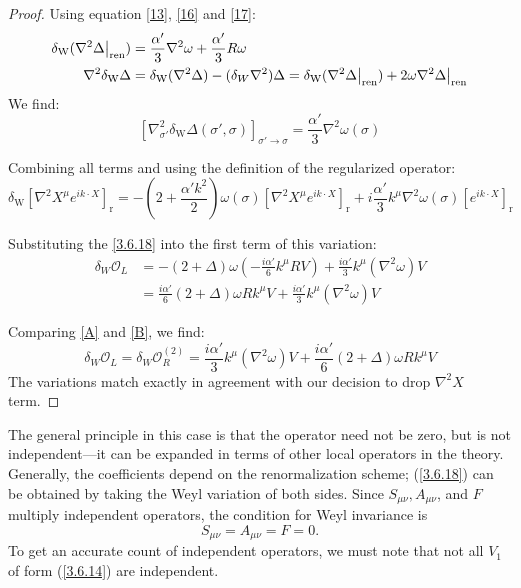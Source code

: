 \begin{tcolorbox}[breakable]
\begin{proof}
	Using equation \eqref{13}, \eqref{16} and \eqref{17}:
	\begin{align}
		\delta_{\mathrm{W}} (\nabla^2 \Delta \big|_{\text{ren}}) &= \frac{\alpha'}{3} \nabla^2 \omega + \frac{\alpha'}{3} R \omega \notag\\
		\nabla^2 \delta_{\mathrm{W}} \Delta &= \delta_{\mathrm{W}}(\nabla^2 \Delta) - (\delta_W\nabla^2)\Delta = \delta_{\mathrm{W}} (\nabla^2 \Delta \big|_{\text{ren}}) + 2\omega\nabla^2\Delta \big|_{\text{ren}}\notag
	\end{align}
	We find:
	\begin{equation}
		\left[ \nabla^2_{\sigma'} \delta_{\mathrm{W}} \Delta(\sigma', \sigma) \right]_{\sigma' \to \sigma} = \frac{\alpha'}{3} \nabla^2\omega(\sigma)
	\end{equation}
	
	Combining all terms and using the definition of the regularized operator:
	\begin{equation}
		\delta_{\mathrm{W}}[\nabla^2 X^\mu e^{ik\cdot X}]_{\mathrm{r}} = -\left(2 + \frac{\alpha' k^2}{2}\right) \omega(\sigma) [\nabla^2 X^\mu e^{ik\cdot X}]_{\mathrm{r}} + i \frac{\alpha'}{3} k^\mu \nabla^2 \omega(\sigma) [e^{ik\cdot X}]_{\mathrm{r}}
	\end{equation}
	
			Substituting the \eqref{3.6.18} into the first term of this variation:
			\begin{align}
				\delta_W \mathcal{O}_L &= -(2 + \Delta) \omega \left( -\frac{i \alpha'}{6} k^\mu R V \right) + \frac{i \alpha'}{3} k^\mu (\nabla^2 \omega) V \\
				&= \frac{i \alpha'}{6} (2 + \Delta) \omega R k^\mu V + \frac{i \alpha'}{3} k^\mu (\nabla^2 \omega) V \label{B}
			\end{align}
			
			Comparing \eqref{A} and \eqref{B}, we find:
			\begin{equation*}
				\delta_W \mathcal{O}_L = \delta_W \mathcal{O}_R^{(2)} = \frac{i \alpha'}{3} k^\mu (\nabla^2 \omega) V + \frac{i \alpha'}{6} (2 + \Delta) \omega R k^\mu V
			\end{equation*}
			The variations match exactly in agreement with our decision to drop $\nabla^2X$ term.
			
	\end{proof}
\end{tcolorbox}
The general principle in this case is that the operator need not be zero, but is not independent—it can be expanded in terms of other local operators in the theory. Generally, the coefficients depend on the renormalization scheme; (\ref{3.6.18}) can be obtained by taking the Weyl variation of both sides. Since $S_{\mu\nu}, A_{\mu\nu}$, and $F$ multiply independent operators, the condition for Weyl invariance is 
\begin{equation}
	S_{\mu\nu} = A_{\mu\nu} = F = 0.
\end{equation}
To get an accurate count of independent operators, we must note that not all $V_1$ of form (\ref{3.6.14}) are independent.


